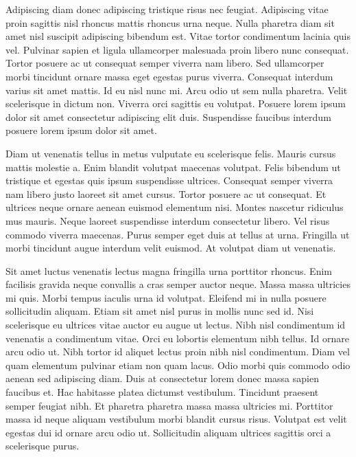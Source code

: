 \documentclass[11pt,a4paper]{article}
\begin{document}
Adipiscing diam donec adipiscing tristique risus nec feugiat. Adipiscing vitae proin sagittis nisl rhoncus mattis rhoncus urna neque. Nulla pharetra diam sit amet nisl suscipit adipiscing bibendum est. Vitae tortor condimentum lacinia quis vel. Pulvinar sapien et ligula ullamcorper malesuada proin libero nunc consequat. Tortor posuere ac ut consequat semper viverra nam libero. Sed ullamcorper morbi tincidunt ornare massa eget egestas purus viverra. Consequat interdum varius sit amet mattis. Id eu nisl nunc mi. Arcu odio ut sem nulla pharetra. Velit scelerisque in dictum non. Viverra orci sagittis eu volutpat. Posuere lorem ipsum dolor sit amet consectetur adipiscing elit duis. Suspendisse faucibus interdum posuere lorem ipsum dolor sit amet.

Diam ut venenatis tellus in metus vulputate eu scelerisque felis. Mauris cursus mattis molestie a. Enim blandit volutpat maecenas volutpat. Felis bibendum ut tristique et egestas quis ipsum suspendisse ultrices. Consequat semper viverra nam libero justo laoreet sit amet cursus. Tortor posuere ac ut consequat. Et ultrices neque ornare aenean euismod elementum nisi. Montes nascetur ridiculus mus mauris. Neque laoreet suspendisse interdum consectetur libero. Vel risus commodo viverra maecenas. Purus semper eget duis at tellus at urna. Fringilla ut morbi tincidunt augue interdum velit euismod. At volutpat diam ut venenatis.

Sit amet luctus venenatis lectus magna fringilla urna porttitor rhoncus. Enim facilisis gravida neque convallis a cras semper auctor neque. Massa massa ultricies mi quis. Morbi tempus iaculis urna id volutpat. Eleifend mi in nulla posuere sollicitudin aliquam. Etiam sit amet nisl purus in mollis nunc sed id. Nisi scelerisque eu ultrices vitae auctor eu augue ut lectus. Nibh nisl condimentum id venenatis a condimentum vitae. Orci eu lobortis elementum nibh tellus. Id ornare arcu odio ut. Nibh tortor id aliquet lectus proin nibh nisl condimentum. Diam vel quam elementum pulvinar etiam non quam lacus. Odio morbi quis commodo odio aenean sed adipiscing diam. Duis at consectetur lorem donec massa sapien faucibus et. Hac habitasse platea dictumst vestibulum. Tincidunt praesent semper feugiat nibh. Et pharetra pharetra massa massa ultricies mi. Porttitor massa id neque aliquam vestibulum morbi blandit cursus risus. Volutpat est velit egestas dui id ornare arcu odio ut. Sollicitudin aliquam ultrices sagittis orci a scelerisque purus.
\end{document}
